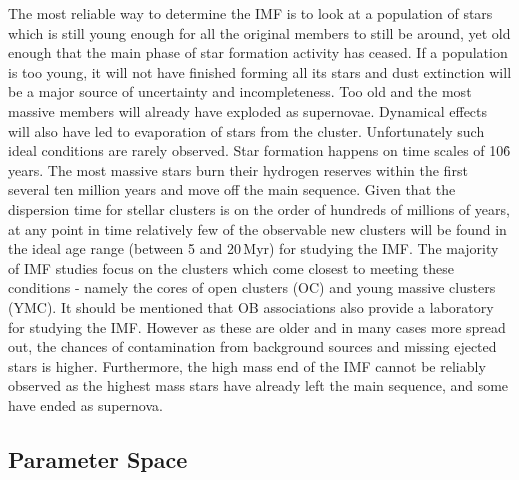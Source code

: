 The most reliable way to determine the IMF is to look at a population of stars which is still young enough for all the original members to still be around, yet old enough that the main phase of star formation activity has ceased\needcite. 
If a population is too young, it will not have finished forming all its stars and dust extinction will be a major source of uncertainty and incompleteness. Too old and the most massive members will already have exploded as supernovae. 
Dynamical effects will also have led to evaporation of stars from the cluster. 
Unfortunately such ideal conditions are rarely observed. 
Star formation happens on time scales of 10\h6 years. 
The most massive stars burn their hydrogen reserves within the first several ten million years and move off the main sequence\needcite. 
Given that the dispersion time for stellar clusters is on the order of hundreds of millions of years, at any point in time relatively few of the observable new clusters will be found in the ideal age range (between 5 and 20\,Myr) for studying the IMF\needcite. 
The majority of IMF studies focus on the clusters which come closest to meeting these conditions - namely the cores of open clusters (OC) and young massive clusters (YMC)\needcite. 
It should be mentioned that OB associations also provide a laboratory for studying the IMF. 
However as these are older and in many cases more spread out, the chances of contamination from background sources and missing ejected stars is higher\needcite\correct. 
Furthermore, the high mass end of the IMF cannot be reliably observed as the highest mass stars have already left the main sequence, and some have ended as supernova\correct.


\subsection{Parameter Space}

